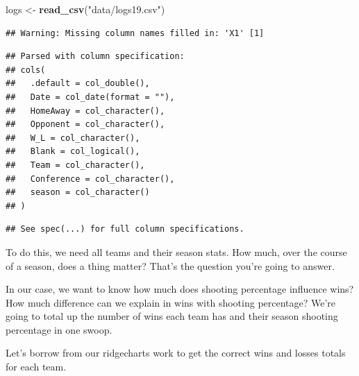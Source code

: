 \documentclass[]{book}
\newenvironment{Shaded}{\begin{snugshade}}{\end{snugshade}}
\newcommand{\DataTypeTok}[1]{\textcolor[rgb]{0.13,0.29,0.53}{#1}}
\newcommand{\DecValTok}[1]{\textcolor[rgb]{0.00,0.00,0.81}{#1}}
\newcommand{\KeywordTok}[1]{\textcolor[rgb]{0.13,0.29,0.53}{\textbf{#1}}}
\newcommand{\NormalTok}[1]{#1}
\newcommand{\OperatorTok}[1]{\textcolor[rgb]{0.81,0.36,0.00}{\textbf{#1}}}
\newcommand{\StringTok}[1]{\textcolor[rgb]{0.31,0.60,0.02}{#1}}
\begin{document}
\begin{Shaded}
\begin{Highlighting}[]
\NormalTok{logs <-}\StringTok{ }\KeywordTok{read_csv}\NormalTok{(}\StringTok{"data/logs19.csv"}\NormalTok{)}
\end{Highlighting}
\end{Shaded}

\begin{verbatim}
## Warning: Missing column names filled in: 'X1' [1]
\end{verbatim}

\begin{verbatim}
## Parsed with column specification:
## cols(
##   .default = col_double(),
##   Date = col_date(format = ""),
##   HomeAway = col_character(),
##   Opponent = col_character(),
##   W_L = col_character(),
##   Blank = col_logical(),
##   Team = col_character(),
##   Conference = col_character(),
##   season = col_character()
## )
\end{verbatim}

\begin{verbatim}
## See spec(...) for full column specifications.
\end{verbatim}

To do this, we need all teams and their season stats. How much, over the course of a season, does a thing matter? That's the question you're going to answer.

In our case, we want to know how much does shooting percentage influence wins? How much difference can we explain in wins with shooting percentage? We're going to total up the number of wins each team has and their season shooting percentage in one swoop.

Let's borrow from our ridgecharts work to get the correct wins and losses totals for each team.

\begin{Shaded}
\end{Shaded}
\end{document}
